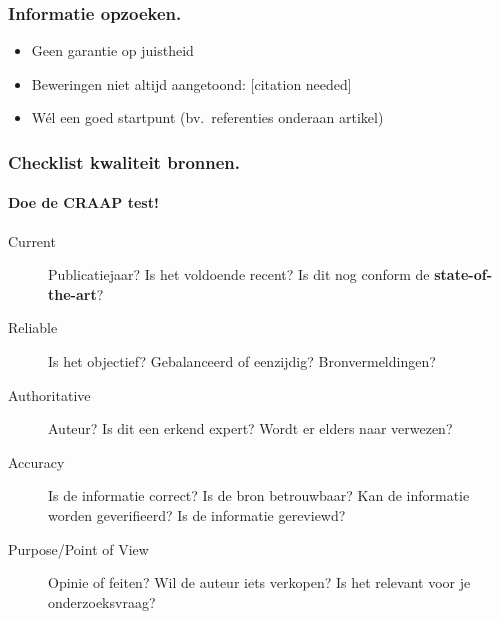 \documentclass[aspectratio=169]{beamer}
\begin{document}
\begin{frame}
  \frametitle{Informatie opzoeken.}


  {\pause}

  \begin{itemize}
    \item Geen garantie op juistheid
    \item Beweringen niet altijd aangetoond: [citation needed]
    \item \alert{Wél} een goed startpunt (bv.\ referenties onderaan artikel)
  \end{itemize}
\end{frame}


\begin{frame}
  \frametitle{Checklist kwaliteit bronnen.}
  \framesubtitle{Doe de CRAAP test!}

  \begin{description}
    \item[Current] Publicatiejaar? Is het voldoende recent? Is dit nog conform de \textbf{state-of-the-art}?
    \item[Reliable] Is het objectief? Gebalanceerd of eenzijdig?
      Bronvermeldingen?
    \item[Authoritative] Auteur? Is dit een erkend expert? Wordt er elders naar verwezen?
    \item[Accuracy] Is de informatie correct? Is de bron betrouwbaar? Kan de informatie worden geverifieerd? Is de informatie gereviewd?
    \item[Purpose/Point of View] Opinie of feiten? Wil de auteur iets verkopen? Is het relevant voor je onderzoeksvraag?
  \end{description}

\end{frame}
\end{document}
